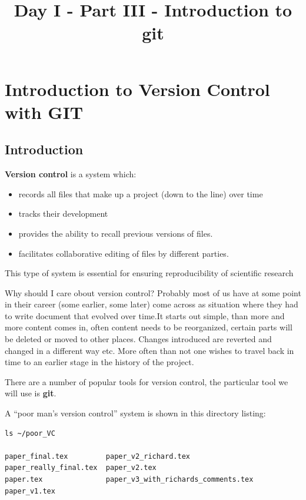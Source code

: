 \documentclass[11pt]{article}
\title{Day I - Part III - Introduction to git}
\providecommand{\tightlist}{%
      \setlength{\itemsep}{0pt}\setlength{\parskip}{0pt}}
\begin{document}
    
    \maketitle
    
    

    
    \hypertarget{introduction-to-version-control-with-git}{%
\section{Introduction to Version Control with
GIT}\label{introduction-to-version-control-with-git}}

    \hypertarget{introduction}{%
\subsection{Introduction}\label{introduction}}

\textbf{Version control} is a system which:

\begin{itemize}
\tightlist
\item
  records all files that make up a project (down to the line) over time
\item
  tracks their development
\item
  provides the ability to recall previous versions of files.
\item
  facilitates collaborative editing of files by different parties.
\end{itemize}

This type of system is essential for ensuring reproducibility of
scientific research

Why should I care obout version control? Probably most of us have at
some point in their career (some earlier, some later) come across as
situation where they had to write document that evolved over time.It
starts out simple, than more and more content comes in, often content
needs to be reorganized, certain parts will be deleted or moved to other
places. Changes introduced are reverted and changed in a different way
etc. More often than not one wishes to travel back in time to an earlier
stage in the history of the project.

    There are a number of popular tools for version control, the particular
tool we will use is \textbf{git}.

    A ``poor man's version control'' system is shown in this directory
listing:

    \begin{verbatim}
ls ~/poor_VC

paper_final.tex         paper_v2_richard.tex
paper_really_final.tex  paper_v2.tex
paper.tex               paper_v3_with_richards_comments.tex
paper_v1.tex
\end{verbatim}
\end{document}

